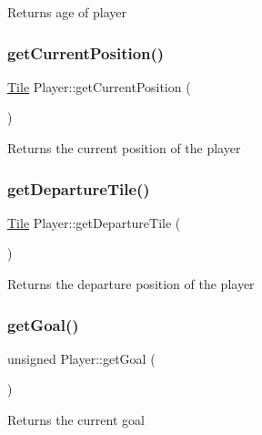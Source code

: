 \begin{DoxyReturn}{Returns}
age of player 
\end{DoxyReturn}
\mbox{\label{classPlayer_a164e97d2f255d0a6c55b9b355e079999}} 
\subsubsection{\texorpdfstring{getCurrentPosition()}{getCurrentPosition()}}
{\footnotesize\ttfamily \mbox{\hyperlink{classTile}{Tile}} Player\+::get\+Current\+Position (\begin{DoxyParamCaption}{ }\end{DoxyParamCaption})}

\begin{DoxyReturn}{Returns}
the current position of the player 
\end{DoxyReturn}
\mbox{\label{classPlayer_a9d585bfefe990358cf55448406cc047b}} 
\subsubsection{\texorpdfstring{getDepartureTile()}{getDepartureTile()}}
{\footnotesize\ttfamily \mbox{\hyperlink{classTile}{Tile}} Player\+::get\+Departure\+Tile (\begin{DoxyParamCaption}{ }\end{DoxyParamCaption})}

\begin{DoxyReturn}{Returns}
the departure position of the player 
\end{DoxyReturn}
\mbox{\label{classPlayer_aae4cea29ac6534922810177b488bdf64}} 
\subsubsection{\texorpdfstring{getGoal()}{getGoal()}}
{\footnotesize\ttfamily unsigned Player\+::get\+Goal (\begin{DoxyParamCaption}{ }\end{DoxyParamCaption})}

\begin{DoxyReturn}{Returns}
the current goal 
\end{DoxyReturn}
\mbox{\label{classPlayer_af1aa472885d589516f483e26e786600e}} 
